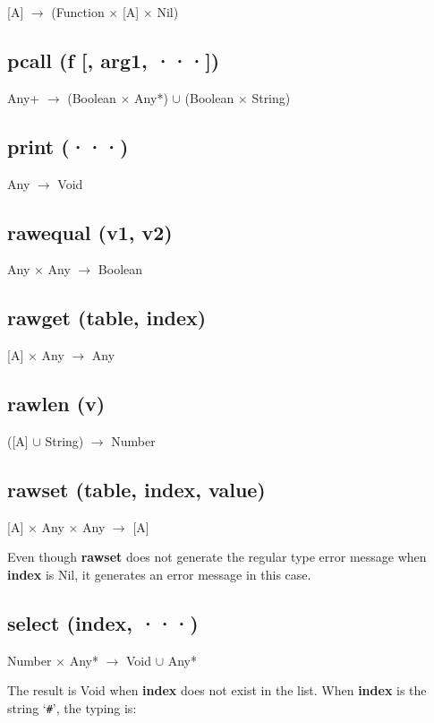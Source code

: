 \documentclass[12pt]{article}
\begin{document}
[A] $\rightarrow$ (Function $\times$ [A] $\times$ Nil)

\subsection{pcall (f [, arg1, ···])}

Any+ $\rightarrow$
(Boolean $\times$ Any*) $\cup$
(Boolean $\times$ String)

\subsection{print (···)}

Any $\rightarrow$ Void

\subsection{rawequal (v1, v2)}

Any $\times$ Any $\rightarrow$ Boolean

\subsection{rawget (table, index)}

[A] $\times$ Any $\rightarrow$ Any

\subsection{rawlen (v)}

([A] $\cup$ String) $\rightarrow$ Number

\subsection{rawset (table, index, value)}

[A] $\times$ Any $\times$ Any $\rightarrow$ [A]

Even though \textbf{rawset} does not generate the regular type error
message when \textbf{index} is Nil, it generates an error message in
this case.

\subsection{select (index, ···)}

Number $\times$ Any* $\rightarrow$ Void $\cup$ Any*

The result is Void when \textbf{index} does not exist in the list.
When \textbf{index} is the string `\texttt{\#}', the typing is:
\end{document}
